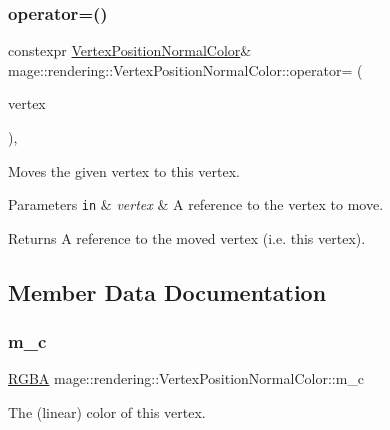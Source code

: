 \subsubsection{\texorpdfstring{operator=()}{operator=()}\hspace{0.1cm}{\footnotesize\ttfamily [2/2]}}
{\footnotesize\ttfamily constexpr \mbox{\hyperlink{structmage_1_1rendering_1_1_vertex_position_normal_color}{Vertex\+Position\+Normal\+Color}}\& mage\+::rendering\+::\+Vertex\+Position\+Normal\+Color\+::operator= (\begin{DoxyParamCaption}\item[{\mbox{\hyperlink{structmage_1_1rendering_1_1_vertex_position_normal_color}{Vertex\+Position\+Normal\+Color}} \&\&}]{vertex }\end{DoxyParamCaption})\hspace{0.3cm}{\ttfamily [default]}, {\ttfamily [noexcept]}}

Moves the given vertex to this vertex.


\begin{DoxyParams}[1]{Parameters}
\mbox{\tt in}  & {\em vertex} & A reference to the vertex to move. \\
\hline
\end{DoxyParams}
\begin{DoxyReturn}{Returns}
A reference to the moved vertex (i.\+e. this vertex). 
\end{DoxyReturn}


\subsection{Member Data Documentation}
\mbox{\label{structmage_1_1rendering_1_1_vertex_position_normal_color_a41410eb9dab6e73b59aac40b69637c05}} 
\subsubsection{\texorpdfstring{m\+\_\+c}{m\_c}}
{\footnotesize\ttfamily \mbox{\hyperlink{structmage_1_1_r_g_b_a}{R\+G\+BA}} mage\+::rendering\+::\+Vertex\+Position\+Normal\+Color\+::m\+\_\+c}

The (linear) color of this vertex. \mbox{\label{structmage_1_1rendering_1_1_vertex_position_normal_color_abf35d5cb0057f76dbd6f153ee0f412f4}} 
